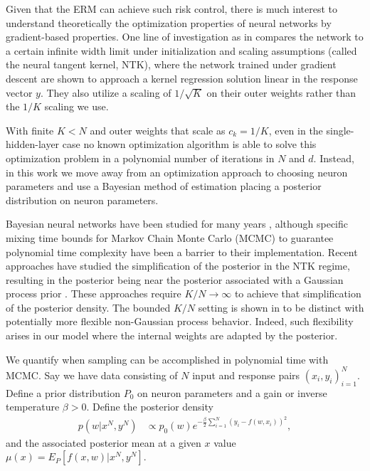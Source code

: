 \documentclass{article}
\numberwithin{equation}{section}
\theoremstyle{Lemma}
\theoremstyle{Corollary}
\theoremstyle{Theorem}
\theoremstyle{Remark}
\begin{document}
Given that the ERM can achieve such risk control, there is much interest to understand theoretically the optimization properties of neural networks by gradient-based properties. One line of investigation as in  \cite{cai2024large,tsigler2023benign,frei2024double,jacot2018neural,liu2022loss} compares the network to a certain infinite width limit under initialization and scaling assumptions (called the neural tangent kernel, NTK), where the network trained under gradient descent are shown to approach a kernel regression solution linear in the response vector $y$. They also utilize a scaling of $1/\sqrt{K}$ on their outer weights rather than the $1/K$ scaling we use.

With finite $K<N$ and outer weights that scale as $c_{k} = 1/K$, even in the single-hidden-layer case no known optimization algorithm is able to solve this optimization problem in a polynomial number of iterations in $N$ and $d$. Instead, in this work we move away from an optimization approach to choosing neuron parameters and use a Bayesian method of estimation placing a posterior distribution on neuron parameters.

Bayesian neural networks have been studied for many years \cite{neal_bayesian_1996,gallego2022current,charnock_bayesian_2020}, although specific mixing time bounds for Markov Chain Monte Carlo (MCMC) to guarantee polynomial time complexity have been a barrier to their implementation. Recent approaches have studied the simplification of the posterior in the NTK regime, resulting in the posterior being near the posterior associated with a Gaussian process prior \cite{hron2022wide,hanin_bayesian_2024}. These approaches require $K/N \to \infty$ to achieve that simplification of the posterior density. The bounded $K/N$ setting is shown in \cite{hron2022wide,hanin_bayesian_2024} to be distinct with potentially more flexible non-Gaussian process behavior. Indeed, such flexibility arises in our model where the internal weights are adapted by the posterior.

We quantify when sampling can be accomplished in polynomial time with MCMC. Say we have data consisting of $N$ input and response pairs $(x_{i}, y_{i})_{i=1}^{N}$. Define a prior distribution $P_{0}$ on neuron parameters and a gain or inverse temperature $\beta>0$. Define the posterior density
\begin{align}
    p(w|x^{N}, y^{N})& \propto p_{0}(w)e^{-\frac{\beta}{2}\sum_{i=1}^{N}(y_{i}-f(w, x_{i}))^{2}},
\end{align}
and the associated posterior mean at a given $x$ value  $\mu(x)= E_{P}[f(x,w)|x^{N}, y^{N}]$.
\end{document}
